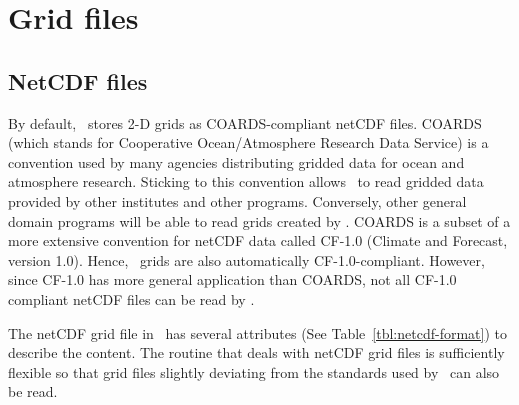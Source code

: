 \section{Grid files} 

\subsection{NetCDF files}

By default, \GMT\ stores 2-D grids as COARDS-compliant netCDF files.
COARDS (which stands for Cooperative Ocean/Atmosphere Research Data Service) is a convention used by
many agencies distributing gridded data for ocean and atmosphere research. Sticking to
this convention allows \GMT\ to read gridded data provided by other institutes
and other programs. Conversely, other general domain programs
will be able to read grids created by \GMT.
COARDS is a subset of a more extensive convention for netCDF data called CF-1.0 (Climate and
Forecast, version 1.0). Hence, \GMT\ grids are also automatically CF-1.0-compliant.
However, since CF-1.0 has more general application than COARDS, not all CF-1.0 compliant netCDF files
can be read by \GMT.

The netCDF grid file in \GMT\ has several attributes (See Table~\ref{tbl:netcdf-format})
to describe the content. The routine
that deals with netCDF grid files is sufficiently flexible so that grid files slightly deviating
from the standards used by \GMT\ can also be read.


